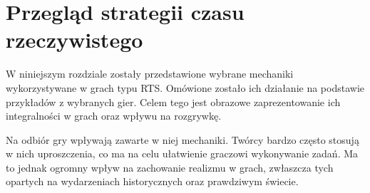 \chapter{Przegląd strategii czasu rzeczywistego}

W niniejszym rozdziale zostały przedstawione wybrane mechaniki wykorzystywane w grach typu RTS. Omówione zostało ich
działanie na podstawie przykładów z wybranych gier. Celem tego jest obrazowe zaprezentowanie ich integralności
w grach oraz wpływu na rozgrywkę.

Na odbiór gry wpływają zawarte w niej mechaniki. Twórcy bardzo często stosują w nich uproszczenia, co ma na celu
ułatwienie graczowi wykonywanie zadań. Ma to jednak ogromny wpływ na zachowanie realizmu w grach, zwłaszcza tych opartych
na wydarzeniach historycznych oraz prawdziwym świecie.














